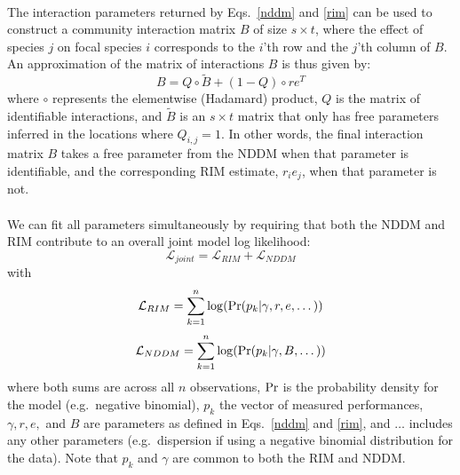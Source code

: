 \documentclass[a4,12pt]{article}
\begin{document}
    \paragraph{}
    The interaction parameters returned by Eqs.~\ref{nddm} and \ref{rim} can be used to construct a community interaction matrix $B$ of size $s \times t$, where the effect of species $j$ on focal species $i$ corresponds to the $i$'th row and the $j$'th column of $B$. An approximation of the matrix of interactions $B$ is thus given by:
        \begin{equation}
        B = Q \circ \tilde B + (1 - Q) \circ r e^T
        \label{matB}
        \end{equation}
    where $\circ$ represents the elementwise (Hadamard) product, $Q$ is the matrix of identifiable interactions, and $\tilde B$ is an $s \times t$ matrix that only has free parameters inferred in the locations where $Q_{i, j} =1$. In other words, the final interaction matrix $B$ takes a free parameter from the NDDM when that parameter is identifiable, and the corresponding RIM estimate, $r_i e_j$, when that parameter is not.

    \paragraph{}
    We can fit all parameters simultaneously by requiring that both the NDDM and RIM contribute to an overall joint model log likelihood:
         \begin{equation}
        \mathcal{L}_{joint} = \mathcal{L}_{RIM} + \mathcal{L}_{NDDM}
        \label{loglikjoint}
        \end{equation}
    with
        \begin{equation}
        \mathcal{L}_{RIM} = \sum_{k=1}^{n} \log ({\rm Pr} (p_k | \gamma, r, e, \dots))
        \label{logrim}
        \end{equation}
        \begin{equation}
        \mathcal{L}_{NDDM} = \sum_{k=1}^{n} \log ({\rm Pr} (p_k | \gamma, B, \dots))
        \label{lognddm}
        \end{equation}
    where both sums are across all $n$ observations, ${\rm Pr}$ is the probability density for the model (e.g.\ negative binomial), $p_k$ the vector of measured performances, $\gamma, r, e,$ and $B$ are parameters as defined in Eqs.~\ref{nddm} and \ref{rim}, and $\dots$ includes any other parameters (e.g.\ dispersion if using a negative binomial distribution for the data). Note that $p_k$ and $\gamma$ are common to both the RIM and NDDM.
\end{document}
